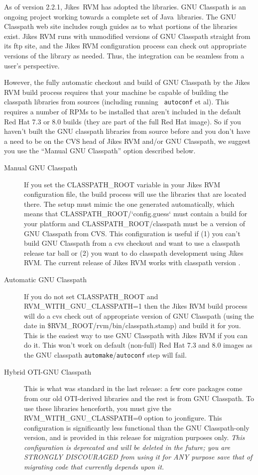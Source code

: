  As of version 2.2.1, Jikes\JikesTMFootnote\ RVM has adopted the
 libraries.  GNU
Classpath is an ongoing project working towards a complete set of
Java\JavaTMFootnote\ libraries. 
The GNU Classpath web site includes
rough guides as to what portions of
the libraries exist. 
Jikes RVM runs with unmodified versions of GNU Classpath straight from its
ftp site, and the Jikes RVM configuration process can check out
appropriate versions of the library as needed.  Thus, the integration
can be seamless from a user's perspective.

However, the fully automatic checkout and build of GNU Classpath by
the Jikes RVM build process requires that your machine be capable of
building the classpath libraries from sources (including running {\tt
autoconf} et al).  This requires a number of RPMs to be installed that
aren't included in the default Red Hat 7.3 or 8.0 builds (they are
part of the full Red Hat image).  So if you haven't built the GNU
classpath libraries from source before and you don't have a need to be
on the CVS head of Jikes RVM and/or GNU Classpath, we suggest you use
the ``Manual GNU Classpath'' option described below.

\begin{description}
\item[Manual GNU Classpath] If you set the CLASSPATH\_ROOT variable in
your Jikes RVM configuration file, the build process will use the
libraries that are located there.  The setup must mimic the one
generated automatically, which means that
CLASSPATH\_ROOT/`config.guess` must contain a build for your platform
and CLASSPATH\_ROOT/classpath must be a version of GNU Classpath from
CVS.  This configuration is useful if (1) you can't build GNU
Classpath from a cvs checkout and want to use a classpath release tar
ball or (2) you want to do classpath development using Jikes RVM. The
current release of Jikes RVM works with classpath version \classpathversion.

\item[Automatic GNU Classpath] If you do not set CLASSPATH\_ROOT and 
RVM\_WITH\_GNU\_CLASSPATH=1 then the Jikes RVM build process will do a
cvs check out of appropriate version of GNU Classpath (using the date
in \$RVM\_ROOT/rvm/bin/classpath.stamp) and build it for you.  This is
the easiest way to use GNU Classpath with Jikes RVM if you can do it.
This won't work on default (non-full) Red Hat 7.3 and 8.0 images
as the GNU classpath {\tt automake}/{\tt autoconf} step will fail.

\item[Hybrid OTI-GNU Classpath] This is what was standard in
the last release: a few core packages come from our old OTI-derived
libraries and the rest is from GNU Classpath.  To use these libraries
henceforth, you must give the RVM\_WITH\_GNU\_CLASSPATH=0 option to
jconfigure.  This configuration is significantly less functional than
the GNU Classpath-only version, and is provided in this release for
migration purposes only.  {\em This configuration is deprecated and
will be deleted in the future; you are STRONGLY DISCOURAGED from using
it for ANY purpose save that of migrating code that currently depends
upon it.}
\end{description}

